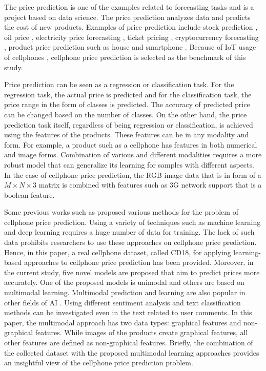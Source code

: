 \documentclass{svjour3}                     \smartqed  \usepackage{graphicx}
\begin{document}
The price prediction is one of the examples related to forecasting tasks and
is a project based on data science. The price prediction  analyzes data and predicts the cost of new products. Examples of price prediction include stock prediction \cite{Parmar2018,TeixeiraZavadzkidePauli2020,Singh2017,Karimuzzaman2021}, oil price \cite{SenGupta2021}, electricity price forecasting \cite{Vilar2018}, ticket pricing \cite{Abdella2019,Lantseva2015}, cryptocurrency forecasting \cite{Azari2019,Kadiroglu2019,Phaladisailoed2018,Lahmiri2019,Ji2019}, product price prediction such as house \cite{park2015using} and smartphone \cite{Chandrashekhara2019}. Because of IoT usage of cellphones \cite{Tien2017}, cellphone price prediction is selected as the benchmark of this study.  

Price prediction can be seen as a regression or classification task. For the regression task, the actual price is predicted and for the classification task, the price range in the form of classes is predicted. The accuracy of predicted price can be changed based on the number of classes.  On the other hand, the price prediction task itself, regardless of being regression or classification, is achieved using the features of the products. These features can be in any modality and form. For example, a product such as a cellphone has features in both numerical and image forms. Combination of various and different modalities requires a more robust model that can generalize its learning for samples with different aspects. In the case of cellphone price prediction, the RGB image data that is in form of a $M\times N\times 3$ matrix is combined with features such as 3G network support that is a boolean feature.

Some previous works such as \cite{Nasser2019,Asim2018,Chandrashekhara2019} proposed various methods for the problem of cellphone price prediction. Using a variety of techniques such as machine learning and deep learning requires a huge number of data for training. The lack of such data prohibits researchers to use these approaches on cellphone price prediction. Hence, in this paper, a real cellphone dataset, called CD18,  for applying learning-based approaches to cellphone price prediction has been provided. Moreover, in the current study, five novel models are proposed that aim to predict prices more accurately. One of the proposed models is unimodal and others are based on multimodal learning. Multimodal prediction and learning are also popular in other fields of AI \cite{asgari2020multimodal,nikzad2020berters}.
Using different sentiment analysis and text classification methods \cite{minaee2020deep,vasfisisi2013text} can be investigated even in the text related to user comments. In this paper, the multimodal approach has two data types: graphical features and non-graphical features. While images of the products create graphical features, all other features are defined as non-graphical features. Briefly, the combination of the collected dataset with the proposed multimodal learning approaches provides an insightful view of the cellphone price prediction problem.
\end{document}
